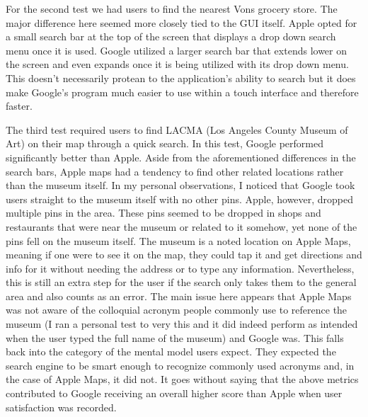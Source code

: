 \documentclass[12pt, oneside]{article}
\begin{document}
For the second test we had users to find the nearest Vons grocery store. The major difference here seemed more closely tied to the GUI itself. Apple opted for a small search bar at the top of the screen that displays a drop down search menu once it is used. Google utilized a larger search bar that extends lower on the screen and even expands once it is being utilized with its drop down menu. This doesn’t necessarily protean to  the application's ability to search but it does make Google's program much easier to use within a touch interface and therefore faster.

The third test required users to find LACMA (Los Angeles County Museum of Art) on their map through a quick search. In this test, Google performed significantly better than Apple. Aside from the aforementioned differences in the search bars, Apple maps had a tendency to find other related locations rather than the museum itself. In my personal observations, I noticed that Google took users straight to the museum itself with no other pins. Apple, however, dropped multiple pins in the area. These pins seemed to be dropped in shops and restaurants that were near the museum or related to it somehow, yet none of the pins fell on the museum itself. The museum is a noted location on Apple Maps, meaning if one were to see it on the map, they could tap it and get directions and info for it without needing the address or to type any information. Nevertheless, this is still an extra step for the user if the search only takes them to the general area and also counts as an error. The main issue here appears that Apple Maps was not aware of the colloquial acronym people commonly use to reference the museum (I ran a personal test to very this and it did indeed perform as intended when the user typed the full name of the museum) and Google was. This falls back into the category of the mental model users expect. They expected the search engine to be smart enough to recognize commonly used acronyms and, in the case of Apple Maps, it did not. It goes without saying that the above metrics contributed to Google receiving an overall higher score than Apple when user satisfaction was recorded. 
\end{document}
